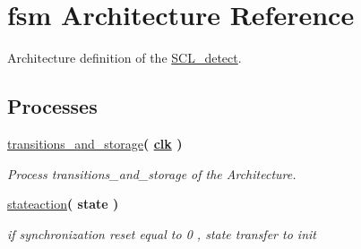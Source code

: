\hypertarget{class_s_c_l__detect_1_1fsm}{}\section{fsm Architecture Reference}
\label{class_s_c_l__detect_1_1fsm}


Architecture definition of the \hyperlink{class_s_c_l__detect}{S\+C\+L\+\_\+detect}.  


\subsection*{Processes}
 \begin{DoxyCompactItemize}
\item 
\hyperlink{class_s_c_l__detect_1_1fsm_aca869937c40a3cb0b3e8467b28f4c42b}{transitions\+\_\+and\+\_\+storage}{\bfseries  ( {\bfseries {\bfseries \hyperlink{class_s_c_l__detect_a6231b307b7958b6060563aa2a93d345a}{clk}} \textcolor{vhdlchar}{ }} )}
\begin{DoxyCompactList}\small\item\em Process transitions\+\_\+and\+\_\+storage of the Architecture. \end{DoxyCompactList}\item 
\hyperlink{class_s_c_l__detect_1_1fsm_ab52d69072c9e0a01dc1a2642b28297ab}{stateaction}{\bfseries  ( {\bfseries \textcolor{vhdlchar}{state}\textcolor{vhdlchar}{ }} )}\hypertarget{class_s_c_l__detect_1_1fsm_ab52d69072c9e0a01dc1a2642b28297ab}{}\label{class_s_c_l__detect_1_1fsm_ab52d69072c9e0a01dc1a2642b28297ab}

\begin{DoxyCompactList}\small\item\em if synchronization reset equal to 0 , state transfer to init \end{DoxyCompactList}\end{DoxyCompactItemize}
